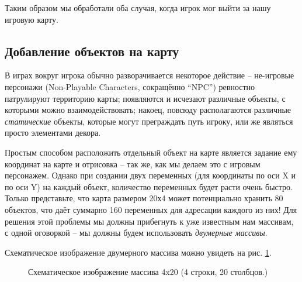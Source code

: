 \documentclass[../sparc.tex]{subfiles}
\begin{document}
Таким образом мы обработали оба случая, когда игрок мог выйти за нашу игровую
карту.

\subsection{Добавление объектов на карту}

В играх вокруг игрока обычно разворачивается некоторое действие -- не-игровые
персонажи (Non-Playable Characters, сокращённо ``NPC'') ревностно патрулируют
территорию карты; появляются и исчезают различные объекты, с которыми можно
взаимодействовать; накоец, повсюду располагаются различные \emph{статические}
объекты, которые могут преграждать путь игроку, или же являться просто
элементами декора.

Простым способом расположить отдельный объект на карте является задание ему
координат на карте и отрисовка -- так же, как мы делаем это с игровым
персонажем.  Однако при создании двух переменных (для координаты по оси X и по
оси Y) на каждый объект, количество переменных будет расти очень быстро.  Только
представьте, что карта размером 20х4 может потенциально хранить 80 объектов, что
даёт суммарно 160 переменных для адресации каждого из них!  Для решения этой
проблемы мы должны прибегнуть к уже известным нам массивам, с одной оговоркой --
мы должны будем использовать \emph{двумерные массивы}.

Схематическое изображение двумерного массива можно увидеть на
рис. \ref{fig:2d-array-example}.

\begin{figure}[ht]
  \centering
  \caption{Схематическое изображение массива 4x20 (4 строки, 20 столбцов.)}
  \label{fig:2d-array-example}
\end{figure}
\end{document}
